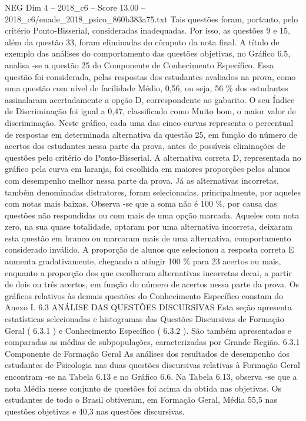 \begin{textsample}{NEG Dim 4 – 2018\_c6 – Score 13.00 – 2018\_c6/enade\_2018\_psico\_860b383a75.txt}
Tais questões foram, portanto, pelo critério Ponto-Bisserial, consideradas inadequadas.
Por isso, as questões 9 e 15, além da questão 33, foram eliminadas do cômputo da nota final.
A título de exemplo das análises do comportamento das questões objetivas, no Gráfico 6.5, analisa -se a questão 25 do Componente de Conhecimento Específico.
Essa questão foi considerada, pelas respostas dos estudantes avaliados na prova, como uma questão com nível de facilidade Médio, 0,56, ou seja, 56 \% dos estudantes assinalaram acertadamente a opção D, correspondente ao gabarito.
O seu Índice de Discriminação foi igual a 0,47, classificado como Muito bom, o maior valor de discriminação.
Neste gráfico, cada uma das cinco curvas representa o percentual de respostas em determinada alternativa da questão 25, em função do número de acertos dos estudantes nessa parte da prova, antes de possíveis eliminações de questões pelo critério do Ponto-Bisserial.
A alternativa correta D, representada no gráfico pela curva em laranja, foi escolhida em maiores proporções pelos alunos com desempenho melhor nessa parte da prova.
Já as alternativas incorretas, também denominadas distratores, foram selecionadas, principalmente, por aqueles com notas mais baixas.
Observa -se que a soma não é 100 \%, por causa das questões não respondidas ou com mais de uma opção marcada.
Aqueles com nota zero, na sua quase totalidade, optaram por uma alternativa incorreta, deixaram esta questão em branco ou marcaram mais de uma alternativa, comportamento considerado inválido.
A proporção de alunos que selecionou a resposta correta E aumenta gradativamente, chegando a atingir 100 \% para 23 acertos ou mais, enquanto a proporção dos que escolheram alternativas incorretas decai, a partir de dois ou três acertos, em função do número de acertos nessa parte da prova.
Os gráficos relativos às demais questões do Conhecimento Específico constam do Anexo I. 6.3 ANÁLISE DAS QUESTÕES DISCURSIVAS Esta seção apresenta estatísticas selecionadas e histogramas das Questões Discursivas de Formação Geral ( 6.3.1 ) e Conhecimento Específico ( 6.3.2 ).
São também apresentadas e comparadas as médias de subpopulações, caracterizadas por Grande Região. 6.3.1 Componente de Formação Geral As análises dos resultados de desempenho dos estudantes de Psicologia nas duas questões discursivas relativas à Formação Geral encontram -se na Tabela 6.13 e no Gráfico 6.6.
Na Tabela 6.13, observa -se que a nota Média nesse conjunto de questões foi acima da obtida nas objetivas.
Os estudantes de todo o Brasil obtiveram, em Formação Geral, Média 55,5 nas questões objetivas e 40,3 nas questões discursivas.

\end{textsample}
